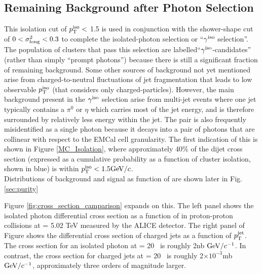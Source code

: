 \subsection{Remaining Background after Photon Selection}

This isolation cut of {$p_{\mathrm{T}}^\mathrm{iso}<$ 1.5 \GeVc} is used in conjunction with the shower-shape cut  of $0<\sigma^{2}_{\mathrm{long}}<0.3$ to complete the isolated-photon selection or ``$\gamma^\mathrm{iso}$ selection''. The population of clusters that pass this selection are labelled``$\gamma^\mathrm{iso}$-candidates'' (rather than simply ``prompt photons'') because there is still a significant fraction of remaining background. Some other sources of background not yet mentioned arise from charged-to-neutral fluctuations of jet fragmentation that leads to low observable $p_{\mathrm{T}}^\mathrm{iso}$ (that considers only charged-particles). However, the main background present in the $\gamma^\mathrm{iso}$ selection arise from multi-jet events where one jet typically contains a $\pi^{0}$ or $\eta$ which carries most of the jet energy, and is therefore surrounded by relatively less energy within the jet. The pair is also frequently misidentified as a single photon because it decays into a pair of photons that are collinear with respect to the EMCal cell granularity. The first indication of this is shown in Figure \ref{MC_Isolation}, where approximately 40\% of the dijet cross section (expressed as a cumulative probability as a function of cluster isolation, shown in blue) is within $p_{\mathrm{T}}^\mathrm{iso} < 1.5 \mathrm{GeV}/c$.\\ Distributions of background and signal as function of \lambdasquare are shown later in Fig. \ref{sec:purity}

Figure \ref{fig:cross_section_camparison} expands on this. The left panel shows the isolated photon differential cross section as a function of \ptgamma in proton-proton collisions at \sqrts = 5.02 TeV measured by the ALICE detector. The right panel of Figure shows the differential cross section of charged jets as a function of $p_{\mathrm{T}}^\mathrm{jet}$. The cross section for an isolated photon at \pt = 20 \GeVc~is roughly 2nb $\mathrm{GeV}/c^{-1}$. In contrast, the cross section for charged jets at \pt = 20 \GeVc~is roughly 2$\times10^{-3}$mb $\mathrm{GeV}/c^{-1}$, approximately three orders of magnitude larger. 

